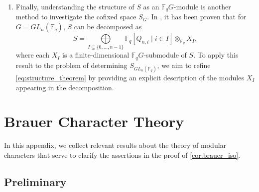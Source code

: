 \documentclass[12pt,a4paper]{report}
\theoremstyle{definition}
\theoremstyle{remark}
\theoremstyle{definition}
\begin{document}
\begin{enumerate}
\begin{enumerate}
\begin{equation*}
        \end{equation*}
        This formula suggests that there should be an operator (corresponding to the first two terms of the right-hand side) that maps the cofixed space in $(n-1)$ variables to the cofixed space in $n$ variables.
        \item Finally, understanding the structure of $S$ as an $\mathbb{F}_q G$-module is another method to investigate the cofixed space $S_G$. In \cite{karagueguzian_symonds_finiteness, symonds_structure_theorem}, it has been proven that for $G=GL_n(\mathbb{F}_q)$, $S$ can be decomposed as
        \begin{equation}\label{eq:structure_theorem}
            S = \bigoplus\limits_{I\subseteq \{0, \ldots, n-1\}}\mathbb{F}_q[Q_{n, i}\mid i\in I]\otimes_{\mathbb{F}_q}X_{I},
        \end{equation}
        where each $X_{I}$ is a finite-dimensional $\mathbb{F}_q G$-submodule of $S$. To apply this result to the problem of determining $S_{GL_n(\mathbb{F}_q)}$, we aim to refine \eqref{eq:structure_theorem} by providing an explicit description  of the modules $X_I$ appearing in the decomposition.  
    \end{enumerate}
\end{enumerate}
\appendix
\chapter{Brauer Character Theory}\label{appendix:brauer_character}
In this appendix, we collect relevant results about the theory of modular characters that serve to clarify the assertions in the proof of \cref{cor:brauer_iso}. 
\section{Preliminary}\label{sec:1}
\end{document}
